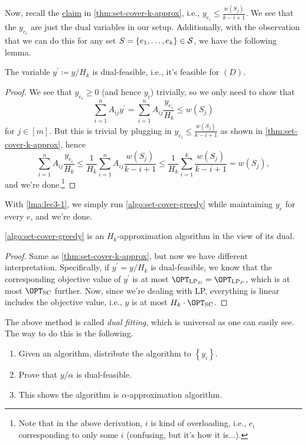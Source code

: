 Now, recall the \hyperref[clm:set-cover-cost]{claim} in \autoref{thm:set-cover-k-approx}, i.e., \(y_{e_i} \leq \frac{w(S_{j})}{k - i + 1}\). We see that the \(y_{e_i} \) are just the dual variables in our setup. Additionally, with the observation that we can do this for any set \(S = \left\{ e_1, \ldots , e_k\right\} \in \mathcal{\MakeUppercase{S}}\), we have the following lemma.
\begin{lemma}\label{lma:lec3-1}
	The variable \(y^\prime \coloneqq y/H_k\) is dual-feasible, i.e., it's feasible for \((D)\).
\end{lemma}
\begin{proof}
	We see that \(y_{e_i} \geq 0\) (and hence \(y_i\)) trivially, so we only need to show that
	\[
		\sum_{i=1}^{n} A_{ij}y^\prime = \sum_{i=1}^{n} A_{ij}\frac{y_{e_i}}{H_k} \leq w(S_{j})
	\]
	for \(j\in [m]\). But this is trivial by plugging in \(y_{e_i} \leq \frac{w(S_j)}{k - i + 1}\) as shown in \autoref{thm:set-cover-k-approx}, hence
	\[
		\sum_{i=1}^{n} A_{ij} \frac{y_{e_i} }{H_k} \leq \frac{1}{H_k}\sum_{i=1}^{n} A_{ij} \frac{w(S_j) }{k - i + 1} \leq \frac{1}{H_k}\sum_{i=1}^{k} \frac{w(S_j)}{k - i + 1} = w(S_j),
	\]
	and we're done.\footnote{Note that in the above derivation, \(i\) is kind of overloading, i.e., \(e_i\) corresponding to only some \(i\) (confusing, but it's how it is...).}
\end{proof}

With \autoref{lma:lec3-1}, we simply run \autoref{algo:set-cover-greedy} while maintaining \(y_e\) for every \(e\), and we're done.

\begin{theorem}
	\autoref{algo:set-cover-greedy} is an \(H_k\)-approximation algorithm in the view of its dual.
\end{theorem}
\begin{proof}
	Same as \autoref{thm:set-cover-k-approx}, but now we have different interpretation. Specifically, if \(y^\prime = y / H_k\) is dual-feasible, we know that the corresponding objective value of \(y^\prime \) is at most \(\OPT_{\mathrm{LP}_D} = \OPT_{\mathrm{LP}_P}\), which is at most \(\OPT_{\mathrm{SC}}\) further. Now, since we're dealing with LP, everything is linear includes the objective value, i.e., \(y\) is at most \(H_k\cdot \OPT_{\mathrm{SC}}\).
\end{proof}

\begin{remark}\label{rmk:dual-fitting}
	The above method is called \emph{dual fitting}, which is universal as one can easily see. The way to do this is the following.
	\begin{enumerate}
		\item Given an algorithm, distribute the algorithm to \(\left\{ y_i \right\}\).
		\item Prove that \(y / \alpha \) is dual-feasible.
		\item This shows the algorithm is \(\alpha\)-approximation algorithm.
	\end{enumerate}
\end{remark}

